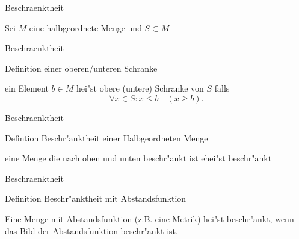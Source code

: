 \documentclass[class=article, crop=false]{standalone}
\begin{document}
\begin{zettel}{Beschraenktheit}

Sei $M$ eine halbgeordnete Menge und $S \subset M$

\begin{flashcard}{Beschraenktheit}
	\begin{question}
		Definition einer oberen/unteren Schranke
	\end{question}
	\begin{definition}
		ein Element $b \in  M$ hei"st obere (untere) Schranke von $S$ falls
		\[
			\forall x \in  S : x \leq b \quad ( x \geq b)
		.\]

	\end{definition}
\end{flashcard}

\begin{flashcard}[5zubwimc]{Beschraenktheit}
	\begin{question}
		Defintion Beschr"anktheit einer Halbgeordneten Menge
	\end{question}
	\begin{definition}
		eine Menge die nach oben und unten beschr"ankt ist ehei"st beschr"ankt
	\end{definition}
\end{flashcard}

\begin{flashcard}[pc3n0wy2]{Beschraenktheit}
	\begin{question}
		Definition Beschr"anktheit mit Abstandsfunktion
	\end{question}
	\begin{definition}
		Eine Menge mit Abstandsfunktion (z.B. eine Metrik) hei"st beschr"ankt, wenn das Bild der Abstandsfunktion beschr"ankt ist.
	\end{definition}
\end{flashcard}

\end{zettel}
\end{document}
